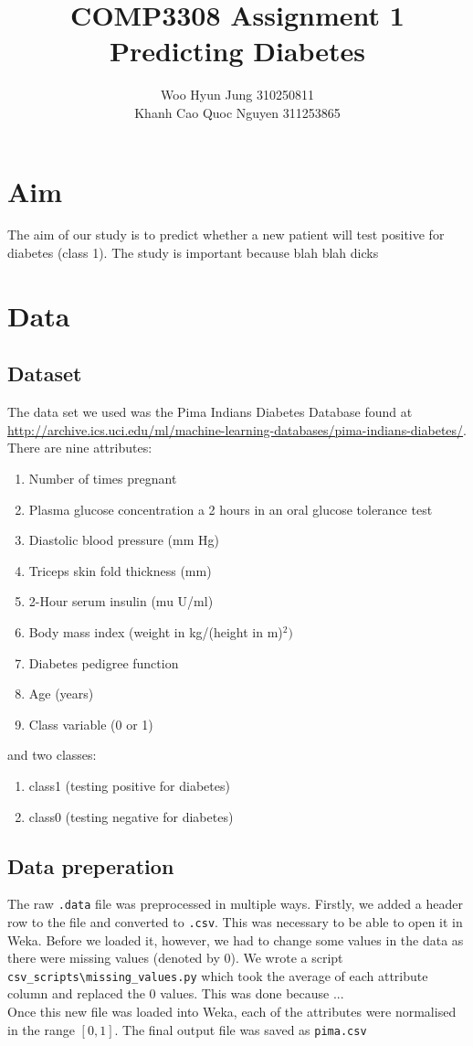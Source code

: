 \documentclass{article}
\title{COMP3308 Assignment 1 \\ Predicting Diabetes}
\author{Woo Hyun Jung 310250811 \\  Khanh Cao Quoc Nguyen 311253865}
\date{}
\renewcommand{\tt}{\texttt}
\begin{document}
\maketitle
\thispagestyle{empty}
\newpage

\section{Aim}
The aim of our study is to predict whether a new patient will test positive for diabetes (class 1). The study is important because blah blah dicks

\section{Data}
\subsection{Dataset}
The data set we used was the Pima Indians Diabetes Database found at \url{http://archive.ics.uci.edu/ml/machine-learning-databases/pima-indians-diabetes/}. \\
There are nine attributes: 
\begin{enumerate}[1.]
\item Number of times pregnant
\item Plasma glucose concentration a 2 hours in an oral glucose tolerance test
\item Diastolic blood pressure (mm Hg)
\item Triceps skin fold thickness (mm)
\item 2-Hour serum insulin (mu U/ml)
\item Body mass index (weight in kg/(height in m)$^2)$
\item Diabetes pedigree function
\item Age (years)
\item Class variable (0 or 1)
\end{enumerate} 
and two classes:
\begin{enumerate}[1.]
\item class1 (testing positive for diabetes)
\item class0 (testing negative for diabetes)
\end{enumerate} 

\subsection{Data preperation}
The raw \tt{.data} file was preprocessed in multiple ways. Firstly, we added a header row to the file and converted to \tt{.csv}. This was necessary to be able to open it in Weka. Before we loaded it, however, we had to change some values in the data as there were missing values (denoted by 0). We wrote a script \tt{csv\_scripts\textbackslash missing\_values.py} which took the average of each attribute column and replaced the 0 values. This was done because ... \\
Once this new file was loaded into Weka, each of the attributes were normalised in the range $[0, 1]$. The final output file was saved as \tt{pima.csv}
\end{document}
